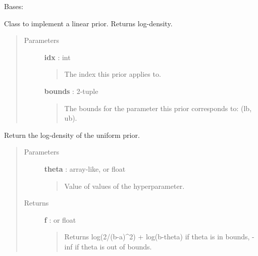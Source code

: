 \documentclass[letterpaper,10pt,english]{sphinxmanual}
\begin{document}
\begin{fulllineitems}
\label{gptools:gptools.utils.LinearPrior}
Bases: 

Class to implement a linear prior. Returns log-density.
\begin{quote}\begin{description}
\item[{Parameters}] \leavevmode
\textbf{idx} : int
\begin{quote}

The index this prior applies to.
\end{quote}

\textbf{bounds} : 2-tuple
\begin{quote}

The bounds for the parameter this prior corresponds to: (lb, ub).
\end{quote}

\end{description}\end{quote}

\begin{fulllineitems}
\label{gptools:gptools.utils.LinearPrior.__call__}
Return the log-density of the uniform prior.
\begin{quote}\begin{description}
\item[{Parameters}] \leavevmode
\textbf{theta} : array-like, or float
\begin{quote}

Value of values of the hyperparameter.
\end{quote}

\item[{Returns}] \leavevmode
\textbf{f} :  or float
\begin{quote}

Returns log(2/(b-a)\textasciicircum{}2) + log(b-theta) if theta is in bounds, -inf
if theta is out of bounds.
\end{quote}

\end{description}\end{quote}

\end{fulllineitems}


\begin{fulllineitems}
\label{gptools:gptools.utils.LinearPrior.interval}
\end{fulllineitems}


\end{fulllineitems}
\end{document}
